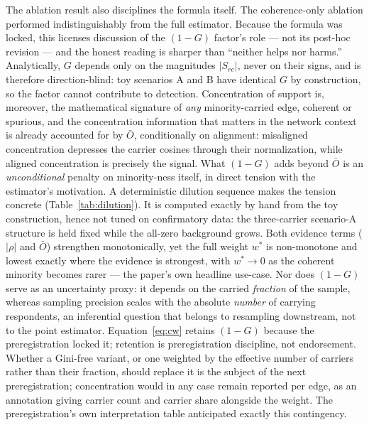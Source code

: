 \documentclass[11pt]{article}
\newcommand{\Obar}{\bar{O}}
\newcommand{\wstar}{w^{*}}
\begin{document}
The ablation result also disciplines the formula itself. The
coherence-only ablation performed indistinguishably from the full
estimator. Because the formula was locked, this licenses discussion of the
$(1-G)$ factor's role --- not its post-hoc revision --- and the honest
reading is sharper than ``neither helps nor harms.'' Analytically, $G$
depends only on the magnitudes $|S_{re}|$, never on their signs, and is
therefore direction-blind: toy scenarios A and B have identical $G$ by
construction, so the factor cannot contribute to detection. Concentration of support is,
moreover, the mathematical signature of \emph{any} minority-carried edge,
coherent or spurious, and the concentration information that matters in the
network context is already accounted for by $\Obar$, conditionally on
alignment: misaligned concentration depresses the carrier cosines through
their normalization, while aligned concentration is precisely the signal. What
$(1-G)$ adds beyond $\Obar$ is an \emph{unconditional} penalty on
minority-ness itself, in direct tension with the estimator's motivation. A
deterministic dilution sequence makes the tension concrete
(Table~\ref{tab:dilution}). It is computed exactly by hand from the toy
construction, hence not tuned on confirmatory data: the three-carrier
scenario-A structure is held fixed while the all-zero background grows.
Both evidence terms ($|\rho|$ and $\Obar$) strengthen monotonically, yet
the full weight $\wstar$ is non-monotone and lowest exactly where the
evidence is strongest, with $\wstar\to0$ as the coherent minority becomes
rarer --- the paper's own headline use-case. Nor
does $(1-G)$ serve as an uncertainty proxy: it depends on the carried
\emph{fraction} of the sample, whereas sampling precision scales with the
absolute \emph{number} of carrying respondents, an inferential question
that belongs to resampling downstream, not to the point estimator. Equation~\eqref{eq:cw} retains
$(1-G)$ because the preregistration locked it; retention is
preregistration discipline, not endorsement. Whether a Gini-free variant,
or one weighted by the effective number of carriers rather than their
fraction, should replace it is the subject of the next preregistration;
concentration would in any case remain reported per edge, as an annotation
giving carrier count and carrier share alongside the weight. The preregistration's own
interpretation table anticipated exactly this contingency.
\end{document}
